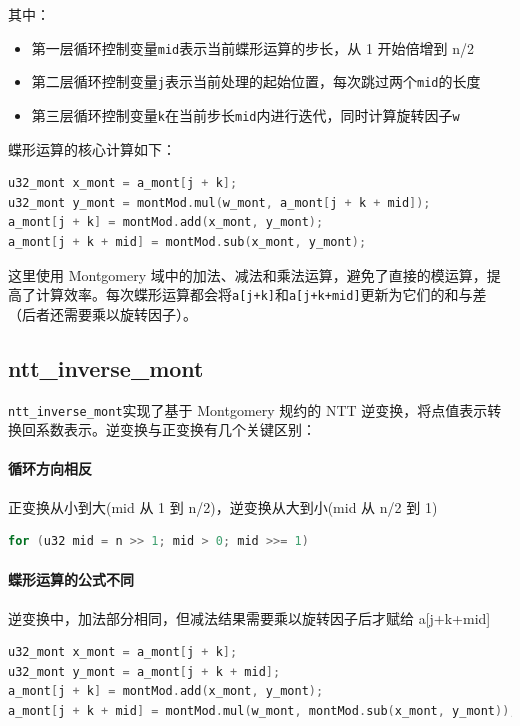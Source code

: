 \documentclass[a4paper]{article}
\begin{document}
其中：

\begin{itemize}
  \item 第一层循环控制变量\texttt{mid}表示当前蝶形运算的步长，从 1 开始倍增到 n/2
  \item 第二层循环控制变量\texttt{j}表示当前处理的起始位置，每次跳过两个\texttt{mid}的长度
  \item 第三层循环控制变量\texttt{k}在当前步长\texttt{mid}内进行迭代，同时计算旋转因子\texttt{w}
\end{itemize}

蝶形运算的核心计算如下：

\begin{lstlisting}[language=C++]
u32_mont x_mont = a_mont[j + k];
u32_mont y_mont = montMod.mul(w_mont, a_mont[j + k + mid]);
a_mont[j + k] = montMod.add(x_mont, y_mont);
a_mont[j + k + mid] = montMod.sub(x_mont, y_mont);
\end{lstlisting}

这里使用 Montgomery 域中的加法、减法和乘法运算，避免了直接的模运算，提高了计算效率。每次蝶形运算都会将\texttt{a[j+k]}和\texttt{a[j+k+mid]}更新为它们的和与差（后者还需要乘以旋转因子）。

\subsection{ntt\_inverse\_mont}

\texttt{ntt\_inverse\_mont}实现了基于 Montgomery 规约的 NTT 逆变换，将点值表示转换回系数表示。逆变换与正变换有几个关键区别：

\paragraph{循环方向相反}

正变换从小到大(mid 从 1 到 n/2)，逆变换从大到小(mid 从 n/2 到 1)

\begin{lstlisting}[language=C++]
for (u32 mid = n >> 1; mid > 0; mid >>= 1)
\end{lstlisting}

\paragraph{蝶形运算的公式不同}

逆变换中，加法部分相同，但减法结果需要乘以旋转因子后才赋给 a[j+k+mid]

\begin{lstlisting}[language=C++]
u32_mont x_mont = a_mont[j + k];
u32_mont y_mont = a_mont[j + k + mid];
a_mont[j + k] = montMod.add(x_mont, y_mont);
a_mont[j + k + mid] = montMod.mul(w_mont, montMod.sub(x_mont, y_mont));
\end{lstlisting}
\end{document}
